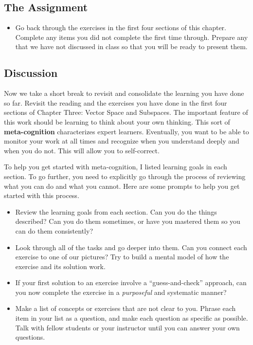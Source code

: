 \documentclass[10pt,]{book}
\newcommand{\terminology}[1]{\textbf{#1}}
\theoremstyle{plain}
\theoremstyle{definition}
\numberwithin{equation}{section}
\begin{document}
\subsection[The Assignment]{The Assignment}\label{subsection-78}
\begin{itemize}
\item{}
        Go back through the exercises in the first four sections of this chapter.
        Complete any items you
        did not complete the first time through. Prepare any that we have not
        discussed in class so that you will be ready to present them.
      \end{itemize}
\typeout{************************************************}
\typeout{************************************************}
\subsection[Discussion]{Discussion}\label{subsection-79}
Now we take a short break to revisit and consolidate the learning you
      have done so far. Revisit the reading and the exercises you have done in
      the first four sections of Chapter Three: Vector Space and Subspaces. The
      important feature of this work should be
      learning to think about your own thinking. This sort of \terminology{meta-cognition}
      characterizes expert learners. Eventually, you want to be able to monitor
      your work at all times and recognize when you understand deeply and when
      you do not. This will allow you to self-correct.
\par
To help you get started with meta-cognition, I listed learning goals in
      each section. To go further, you need to explicitly go through the process
      of reviewing what you can do and what you cannot. Here are some prompts to
      help you get started with this process.
      \begin{itemize}
\item{}
          Review the learning goals from each section. Can you do the things
          described? Can you do them sometimes, or have you mastered them so you
          can do them consistently?
        \item{}
          Look through all of the tasks and go deeper into them. Can you
          connect each exercise to one of our pictures? Try to build a mental
          model of how the exercise and its solution work.
        \item{}
          If your first solution to an exercise involve a ``guess-and-check''
          approach, can you now complete the exercise in a \emph{purposeful}
          and systematic manner?
        \item{}
          Make a list of concepts or exercises that are not clear to you. Phrase
          each item in your list as a question, and make each question as
          specific as possible. Talk with fellow students or your
          instructor until you can answer your own questions.
        \end{itemize}
\end{document}
